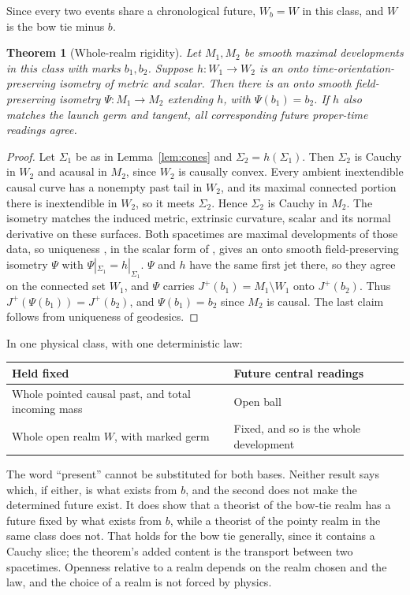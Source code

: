 \documentclass[11pt]{article}
\newtheorem{theorem}{Theorem}
\theoremstyle{definition}
\newcommand{\Jp}{J^{+}}
\begin{document}
Since every two events share a chronological future, $W_b=W$ in this class, and $W$ is the bow tie minus $b$.

\begin{theorem}[Whole-realm rigidity]\label{thm:rigidity}
Let $M_1,M_2$ be smooth maximal developments in this class with marks $b_1,b_2$. Suppose
$h:W_1\to W_2$ is an onto time-orientation-preserving isometry of metric and scalar. Then there is an onto smooth field-preserving isometry $\Psi:M_1\to M_2$ extending $h$, with $\Psi(b_1)=b_2$. If $h$ also matches the launch germ and tangent, all
corresponding future proper-time readings agree.
\end{theorem}

\begin{proof}
Let $\Sigma_1$ be as in Lemma~\ref{lem:cones} and $\Sigma_2=h(\Sigma_1)$. Then $\Sigma_2$ is Cauchy in $W_2$ and
acausal in $M_2$, since $W_2$ is causally convex. Every ambient inextendible causal curve has a nonempty past
tail in $W_2$, and its maximal connected portion there is inextendible in $W_2$, so it meets $\Sigma_2$. Hence
$\Sigma_2$ is Cauchy in $M_2$. The isometry matches the induced metric, extrinsic curvature, scalar and its normal
derivative on these surfaces. Both spacetimes are maximal developments of those data, so uniqueness \citep{CBG1969,Ringstrom2009}, in the scalar form of \citet{RingstromNote}, gives an onto smooth field-preserving isometry $\Psi$ with $\Psi|_{\Sigma_1}=h|_{\Sigma_1}$. $\Psi$ and $h$ have the same first jet there, so they agree on the connected set $W_1$, and $\Psi$ carries $\Jp(b_1)=M_1\setminus W_1$ onto $\Jp(b_2)$. Thus $\Jp(\Psi(b_1))=\Jp(b_2)$, and $\Psi(b_1)=b_2$ since $M_2$ is causal. The last claim follows from uniqueness of geodesics.
\end{proof}

In one physical class, with one deterministic law:
\begin{center}
\begin{tabularx}{\textwidth}{@{}Yl@{}}
\toprule
Held fixed & Future central readings\\
\midrule
Whole pointed causal past, and total incoming mass & Open ball\\
Whole open realm $W$, with marked germ & Fixed, and so is the whole development\\
\bottomrule
\end{tabularx}
\end{center}
The word ``present'' cannot be substituted for both bases. Neither result says which, if either, is
what exists from $b$, and the second does not make the determined future exist. It does show that a theorist of the bow-tie realm has a future fixed by what exists from $b$, while a theorist of the pointy realm in the same class does not. That holds for the bow tie generally, since it contains a Cauchy slice; the theorem's added content is the transport between two spacetimes. Openness relative to a realm depends on the realm chosen and the law, and the choice of a realm is not forced by physics.
\end{document}
